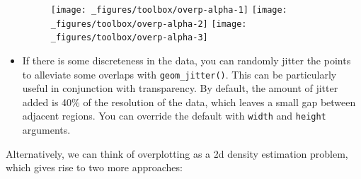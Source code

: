 \begin{itemize}
  \begin{figure}[H]
    \texttt{[image: \_figures/toolbox/overp-alpha-1]}%
    \texttt{[image: \_figures/toolbox/overp-alpha-2]}%
    \texttt{[image: \_figures/toolbox/overp-alpha-3]}
  \end{figure}
\item
  If there is some discreteness in the data, you can randomly jitter the
  points to alleviate some overlaps with \texttt{geom\_jitter()}. This
  can be particularly useful in conjunction with transparency. By
  default, the amount of jitter added is 40\% of the resolution of the
  data, which leaves a small gap between adjacent regions. You can
  override the default with \texttt{width} and \texttt{height}
  arguments.
\end{itemize}

Alternatively, we can think of overplotting as a 2d density estimation
problem, which gives rise to two more approaches:

